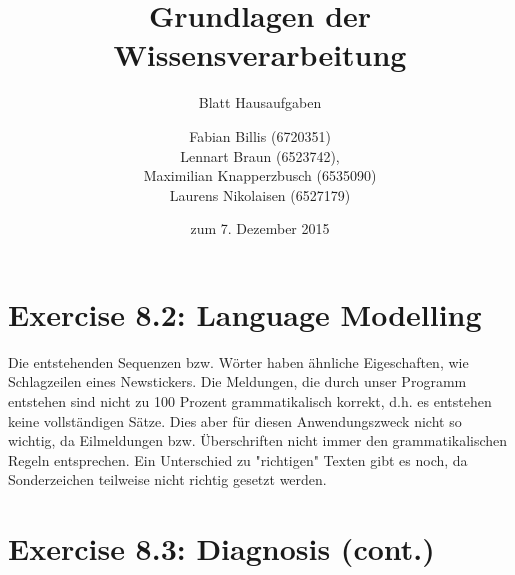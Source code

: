 \documentclass[a4paper]{scrartcl}
\title{Grundlagen der Wissensverarbeitung}
\subtitle{Blatt {\blattnr} Hausaufgaben}
\author{
    Fabian Billis (6720351) \\
    Lennart Braun (6523742), \\
    Maximilian Knapperzbusch (6535090) \\
    Laurens Nikolaisen (6527179) \\
}
\date{zum 7. Dezember 2015}
\def \blattnr {8}
\begin{document}
\maketitle

\section*{Exercise \blattnr.2: Language Modelling}
Die entstehenden Sequenzen bzw. Wörter haben ähnliche Eigeschaften, wie Schlagzeilen eines Newstickers.
Die Meldungen, die durch unser Programm entstehen sind nicht zu 100 Prozent grammatikalisch korrekt, d.h.
es entstehen keine vollständigen Sätze. Dies aber für diesen Anwendungszweck nicht so wichtig, da Eilmeldungen bzw. Überschriften nicht immer den grammatikalischen Regeln entsprechen.
Ein Unterschied zu "richtigen" Texten gibt es noch, da Sonderzeichen teilweise nicht richtig gesetzt werden.


\section*{Exercise \blattnr.3: Diagnosis (cont.)}
\end{document}
